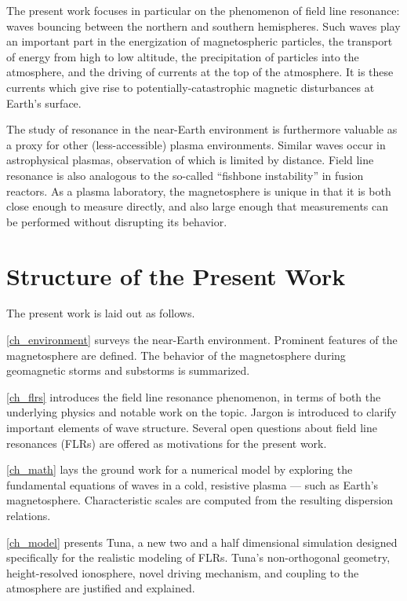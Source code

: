 The present work focuses in particular on the phenomenon of field line
resonance: \Alfven waves bouncing between the northern and southern
hemispheres. Such waves play an important part in the energization of
magnetospheric particles, the transport of energy from high to low altitude,
the precipitation of particles into the atmosphere, and the driving of currents
at the top of the atmosphere. It is these currents which give rise to
potentially-catastrophic magnetic disturbances at Earth's surface. 

The study of resonance in the near-Earth environment is furthermore valuable as
a proxy for other (less-accessible) plasma environments. Similar waves occur in
astrophysical plasmas, observation of which is limited by distance. Field line
resonance is also analogous to the so-called ``fishbone instability'' in fusion
reactors. As a plasma laboratory, the magnetosphere is unique in that it is
both close enough to measure directly, and also large enough that measurements
can be performed without disrupting its behavior. 

\section{Structure of the Present Work}

The present work is laid out as follows. 

\cref{ch_environment} surveys the near-Earth environment. Prominent features of
the magnetosphere are defined. The behavior of the magnetosphere during
geomagnetic storms and substorms is summarized. 

\cref{ch_flrs} introduces the field line resonance phenomenon, in terms of both
the underlying physics and notable work on the topic. Jargon is introduced to
clarify important elements of wave structure. Several open questions about
field line resonances (FLRs) are offered as motivations for the present work. 

\cref{ch_math} lays the ground work for a numerical model by exploring the
fundamental equations of waves in a cold, resistive plasma --- such as
Earth's magnetosphere. Characteristic scales are computed from the resulting
dispersion relations. 

\cref{ch_model} presents Tuna, a new two and a half dimensional simulation
designed specifically for the realistic modeling of FLRs. Tuna's
non-orthogonal geometry, height-resolved ionosphere, novel driving mechanism,
and coupling to the atmosphere are justified and explained. 

